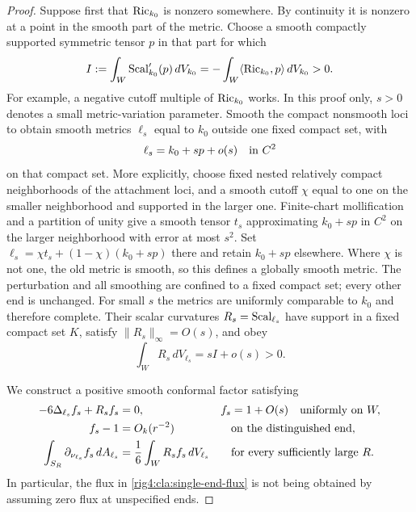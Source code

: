 \begin{proof}
Suppose first that $\operatorname{Ric}_{k_0}$ is nonzero somewhere.
By continuity it is nonzero at a point in the smooth part of the
metric.  Choose a smooth compactly supported symmetric tensor $p$
in that part for which
\begin{equation}\label{rig4:cla:positive-scalar-variation}
 I:=\int_W \operatorname{Scal}'_{k_0}(p)\,dV_{k_0}
   =-\int_W\langle\operatorname{Ric}_{k_0},p\rangle\,dV_{k_0}>0.
\end{equation}
For example, a negative cutoff multiple of $\operatorname{Ric}_{k_0}$ works.
In this proof only, $s>0$ denotes a small metric-variation parameter.
Smooth the compact nonsmooth loci to obtain smooth metrics $\ell_s$
equal to $k_0$ outside one fixed compact set, with
\[
 \ell_s=k_0+s p+o(s)\quad\hbox{in }C^2
\]
on that compact set.  More explicitly, choose fixed nested relatively
compact neighborhoods of the attachment loci, and a smooth cutoff
$\chi$ equal to one on the smaller neighborhood and supported in the
larger one.  Finite-chart mollification and a partition of unity give
a smooth tensor $t_s$ approximating $k_0+s p$ in $C^2$ on the larger
neighborhood with error at most $s^2$.  Set
$\ell_s=\chi t_s+(1-\chi)(k_0+s p)$ there and retain $k_0+s p$
elsewhere.  Where $\chi$ is not one, the old metric is smooth, so this
defines a globally smooth metric.  The perturbation and all smoothing
are confined to a fixed compact set; every other end is unchanged.
For small $s$ the metrics are uniformly comparable to $k_0$ and
therefore complete.  Their scalar curvatures
$R_s=\operatorname{Scal}_{\ell_s}$ have support in a fixed compact set $K$,
satisfy $\|R_s\|_\infty=O(s)$, and obey
\begin{equation}\label{rig4:cla:scalar-integral}
 \int_W R_s\,dV_{\ell_s}=sI+o(s)>0.
\end{equation}

We construct a positive smooth conformal factor satisfying
\begin{align}
 -6\Delta_{\ell_s}f_s+R_sf_s&=0,
       & f_s&=1+O(s)\quad\hbox{uniformly on }W,
       \label{rig4:cla:conformal-equation}\\
 f_s-1&=O_k(r^{-2})
       &&\hbox{on the distinguished end},
       \label{rig4:cla:factor-decay}\\
 \int_{S_R}\partial_{\nu_{\ell_s}}f_s\,dA_{\ell_s}
       &=\frac16\int_W R_sf_s\,dV_{\ell_s}
       &&\hbox{for every sufficiently large }R.
       \label{rig4:cla:single-end-flux}
\end{align}
In particular, the flux in \eqref{rig4:cla:single-end-flux} is not being
obtained by assuming zero flux at unspecified ends.


\end{proof}
